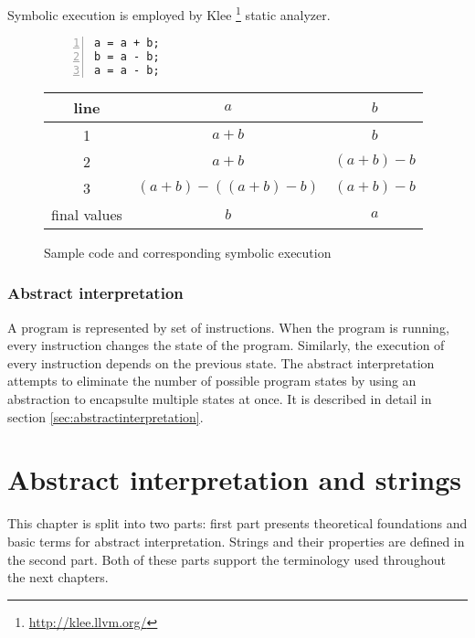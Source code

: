 \documentclass[12pt,final,oneside]{fithesis2}
\theoremstyle{definition}
\begin{document}
Symbolic execution is employed by Klee \footnote{\url{http://klee.llvm.org/}}
static analyzer.

\begin{figure}[ht]
\begin{minipage}{0.3\textwidth}
\begin{lstlisting}[numbers=left]
a = a + b;
b = a - b;
a = a - b;
\end{lstlisting}
\end{minipage}
\begin{minipage}{0.7\textwidth}
\begin{tabular}{c|c|c}
line & $a$                       & $b$ \\
\hline
1    & $a + b$                   & $b$ \\
2    & $a + b$                   & $(a + b) - b$ \\
3    & $(a + b) - ((a + b) - b)$ & $(a + b) - b$ \\
\hline \hline
final values & $b$             & $a$ \\
\end{tabular}
\end{minipage}
\caption{Sample code and corresponding symbolic execution}
\label{fig:se}
\end{figure}

\subsection{Abstract interpretation}

A program is represented by set of instructions. When the program is
running, every instruction changes the state of the program. Similarly,
the execution of every instruction depends on the previous state.
The abstract interpretation attempts to eliminate the number of possible
program states by using an abstraction to encapsulte multiple states at
once. It is described in detail in section \ref{sec:abstractinterpretation}.


\chapter{Abstract interpretation and strings}
\label{chap:preliminaries}

This chapter is split into two parts:
first part presents theoretical foundations and basic terms for
abstract interpretation. Strings and their properties are defined in the
second part. Both of these parts support the terminology used throughout
the next chapters.
\end{document}
